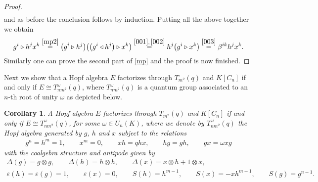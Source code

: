 \documentclass[10pt,a4paper]{amsart}
\numberwithin{equation}{section}
\newtheorem{Corollary}[Theorem]{Corollary}
\begin{document}
\begin{proof}
\begin{gather*}
\end{gather*}
and as before the conclusion follows by induction. Putting all the above together we obtain
\begin{gather*}
g^{i} \triangleright h^{j} x^{k} \stackrel{\eqref{mp2}} {=} \big(g^{i} \triangleright h^{j}\big)\big( \big(g^{i} \triangleleft h^{j}\big)\triangleright x^{k}\big) \stackrel{\eqref{001}, \, \eqref{002}} {=} h^{j} \big(g^{i} \triangleright x^{k}\big)\stackrel{\eqref{003}} {=} \beta^{ik} h^{j} x^{k}.
\end{gather*}
Similarly one can prove the second part of \eqref{mp} and the proof is now finished.
\end{proof}

Next we show that a Hopf algebra $E$ factorizes through $T_{m^{2}}(q)$ and $K[C_n]$ if and only if $E \cong T_{nm^{2}}^{\omega}(q)$, where $T_{nm^{2}}^ {\omega}(q)$ is a quantum group associated to an $n$-th root of unity $\omega$ as depicted below.

\begin{Corollary}\label{primaclasi}
A Hopf algebra $E$ factorizes through $T_{m^{2}}(q)$ and $K[C_n]$ if and only if $E \cong T_{nm^{2}}^ {\omega}(q)$, for some $\omega \in U_n (K)$, where we denote by $T_{nm^{2}}^{\omega}(q)$ the Hopf algebra generated by $g$, $h$ and $x$ subject to the relations
\begin{gather*}
g^{n} = h^{m} = 1,\qquad x^{m} = 0,\qquad x h = q h x, \qquad h g = g h,\qquad g x = \omega x g
\end{gather*}
with the coalgebra structure and antipode given by
\begin{gather*}
\Delta(g) = g \otimes g, \qquad \Delta(h) = h \otimes h, \qquad \Delta(x) = x \otimes h + 1 \otimes x,\\
\varepsilon(h) = \varepsilon(g) = 1, \qquad \varepsilon(x) = 0, \qquad S(h) = h^{m-1}, \qquad S(x) = -xh^{m-1}, \qquad S(g) = g^{n-1}.
\end{gather*}
\end{Corollary}
\end{document}
